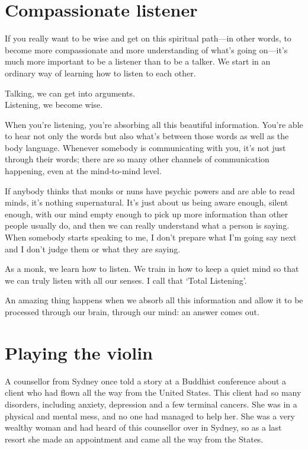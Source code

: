 \documentclass[12pt, openany]{book}
\newenvironment{aphorism}%
{%
\begin{center}\begin{itshape}
}%
{\end{itshape}\end{center}
}%
\begin{document}
\section*{Compassionate listener}

If you really want to be wise and get on this spiritual path—in other words, to become more compassionate and more understanding of what’s going on—it’s much more important to be a listener than to be a talker. We start in an ordinary way of learning how to listen to each other. 

\begin{aphorism}
Talking, we can get into arguments.\\  
Listening, we become wise.
\end{aphorism}

When you’re listening, you’re absorbing all this beautiful information. You’re able to hear not only the words but also what’s between those words as well as the body language. Whenever somebody is communicating with you, it’s not just through their words; there are so many other channels of communication happening, even at the mind-to-mind level. 

If anybody thinks that monks or nuns have psychic powers and are able to read minds, it’s nothing supernatural. It’s just about us being aware enough, silent enough, with our mind empty enough to pick up more information than other people usually do, and then we can really understand what a person is saying. When somebody starts speaking to me, I don’t prepare what I’m going say next and I don’t judge them or what they are saying. 

As a monk, we learn how to listen. We train in how to keep a quiet mind so that we can truly listen with all our senses. I call that ‘Total Listening’. 

An amazing thing happens when we absorb all this information and allow it to be processed through our brain, through our mind: an answer comes out. 

\section*{Playing the violin}

A counsellor from Sydney once told a story at a Buddhist conference about a client who had flown all the way from the United States. This client had so many disorders, including anxiety, depression and a few terminal cancers. She was in a physical and mental mess, and no one had managed to help her. She was a very wealthy woman and had heard of this counsellor over in Sydney, so as a last resort she made an appointment and came all the way from the States. 
\end{document}
